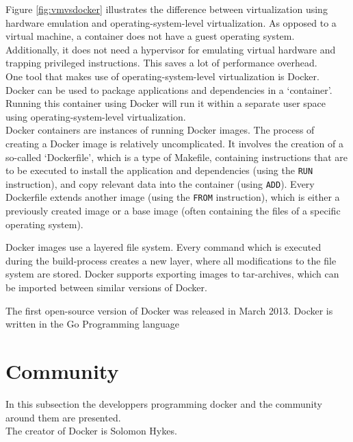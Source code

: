 Figure \ref{fig:vmvsdocker} illustrates the difference between virtualization using hardware emulation and operating-system-level virtualization. As opposed to a virtual machine, a container does not have a guest operating system. Additionally, it does not need a hypervisor for emulating virtual hardware and trapping privileged instructions. This saves a lot of performance overhead. \\

One tool that makes use of operating-system-level virtualization is Docker. Docker can be used to package applications and dependencies in a `container'. Running this container using Docker will run it within a separate user space using operating-system-level virtualization. \\
Docker containers are instances of running Docker images. The process of creating a Docker image is relatively uncomplicated. It involves the creation of a so-called `Dockerfile', which is a type of Makefile, containing instructions that are to be executed to install the application and dependencies (using the \verb|RUN| instruction), and copy relevant data into the container (using \verb|ADD|). Every Dockerfile extends another image (using the \verb|FROM| instruction), which is either a previously created image or a base image (often containing the files of a specific operating system).

Docker images use a layered file system. Every command which is executed during the
build-process creates a new layer, where all modifications to the file system are stored.
Docker supports exporting images to tar-archives, which can be imported between similar versions of Docker.

The first open-source version of Docker was released in March 2013. Docker is written in the Go Programming language \\



\section{Community}


In this subsection the developpers programming docker and the community around them are presented. \\
The creator of Docker is Solomon Hykes. \\

